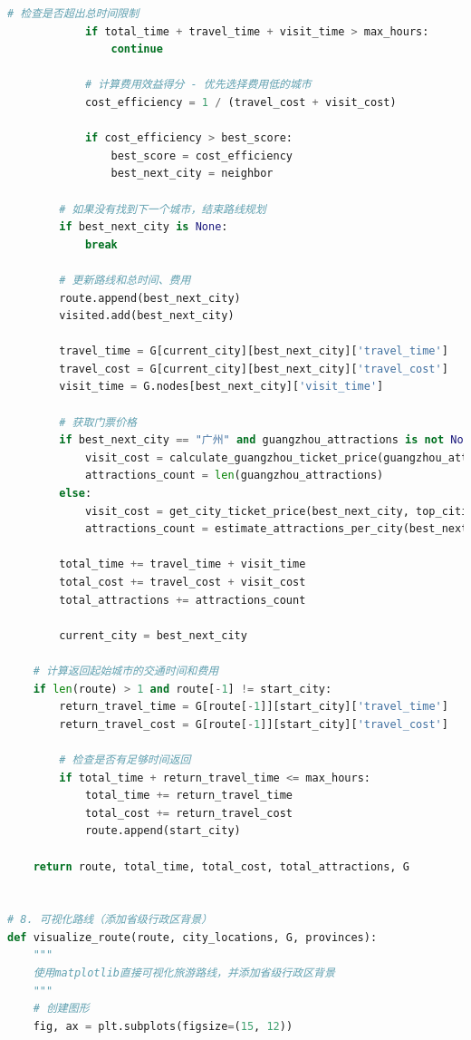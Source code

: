 \documentclass[withoutpreface,bwprint]{cumcmthesis} %
\begin{document}
\begin{appendices}
\begin{lstlisting}[language=python]
            # 检查是否超出总时间限制
            if total_time + travel_time + visit_time > max_hours:
                continue
                
            # 计算费用效益得分 - 优先选择费用低的城市
            cost_efficiency = 1 / (travel_cost + visit_cost)
            
            if cost_efficiency > best_score:
                best_score = cost_efficiency
                best_next_city = neighbor
        
        # 如果没有找到下一个城市，结束路线规划
        if best_next_city is None:
            break
            
        # 更新路线和总时间、费用
        route.append(best_next_city)
        visited.add(best_next_city)
        
        travel_time = G[current_city][best_next_city]['travel_time']
        travel_cost = G[current_city][best_next_city]['travel_cost']
        visit_time = G.nodes[best_next_city]['visit_time']
        
        # 获取门票价格
        if best_next_city == "广州" and guangzhou_attractions is not None:
            visit_cost = calculate_guangzhou_ticket_price(guangzhou_attractions)
            attractions_count = len(guangzhou_attractions)
        else:
            visit_cost = get_city_ticket_price(best_next_city, top_cities)
            attractions_count = estimate_attractions_per_city(best_next_city, top_cities)
        
        total_time += travel_time + visit_time
        total_cost += travel_cost + visit_cost
        total_attractions += attractions_count
        
        current_city = best_next_city
    
    # 计算返回起始城市的交通时间和费用
    if len(route) > 1 and route[-1] != start_city:
        return_travel_time = G[route[-1]][start_city]['travel_time']
        return_travel_cost = G[route[-1]][start_city]['travel_cost']
        
        # 检查是否有足够时间返回
        if total_time + return_travel_time <= max_hours:
            total_time += return_travel_time
            total_cost += return_travel_cost
            route.append(start_city)
    
    return route, total_time, total_cost, total_attractions, G


# 8. 可视化路线（添加省级行政区背景）
def visualize_route(route, city_locations, G, provinces):
    """
    使用matplotlib直接可视化旅游路线，并添加省级行政区背景
    """
    # 创建图形
    fig, ax = plt.subplots(figsize=(15, 12))
    

\end{lstlisting}
\end{appendices}
\end{document}
